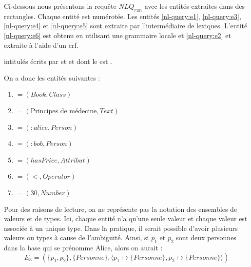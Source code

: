 \begin{example}
    \label{ex:nl-query:simpleEnts}
    Ci-dessous nous présentons la requête $NLQ_{run}$ avec les entités extraites dans des rectangles.
    Chaque entité est numérotée.
    Les entités \ref{nl-query:e1}, \ref{nl-query:e3}, \ref{nl-query:e4} et \ref{nl-query:e5} sont extraite par l'intermédiaire de lexiques.
    L'entité \ref{nl-query:e6} est obtenu en utilisant une grammaire locale et \ref{nl-query:e2} et extraite à l'aide d'un \gls{crf}.

    \begin{displayquote}
         intitulés  écrits par  et  et dont le  est  .
    \end{displayquote}

    \noindent
    On a donc les entités suivantes :
    \begin{multicols}{2}
        \begin{enumerate}[label=$E_{\arabic*}$]
            \item \label{nl-query:e1} $= (Book, Class)$
            \item \label{nl-query:e2} $= (\text{Principes de médecine}, Text)$
            \item \label{nl-query:e3} $= (:alice, Person)$
            \item \label{nl-query:e4} $= (:bob, Person)$
            \item \label{nl-query:e5} $= (hasPrice, Attribut)$
            \item \label{nl-query:e6} $= (<, Operator)$
            \item \label{nl-query:e7} $= (30, Number)$
        \end{enumerate}
    \end{multicols}

    Pour des raisons de lecture, on ne représente pas la notation des ensembles de valeurs et de types.
    Ici, chaque entité n'a qu'une seule valeur et chaque valeur est associée à un unique type.
    Dans la pratique, il serait possible d'avoir plusieurs valeurs ou types à cause de l'ambiguïté.
    Ainsi, si $p_1$ et $p_2$ sont deux personnes dans la base qui se prénomme Alice, alors on aurait :
    \begin{equation*}
        E_3 = (\{p_1, p_2\}, \{Personne\}, \langle p_1 \mapsto \{Personne\}, p_2 \mapsto \{Personne\} \rangle)
    \end{equation*}
\end{example}

